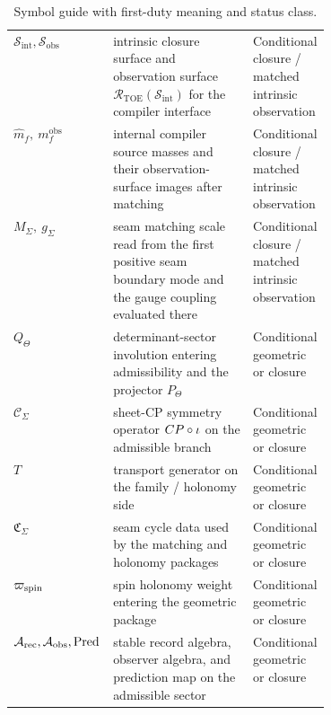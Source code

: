 \begin{table}[t]
\begin{tabularx}{\linewidth}{@{}>{\raggedright\arraybackslash}p{0.23\linewidth}Y>{\raggedright\arraybackslash}p{0.18\linewidth}@{}}
$\mathcal S_{\mathrm{int}},\mathcal S_{\mathrm{obs}}$ & intrinsic closure surface and observation surface $\mathcal R_{\mathrm{TOE}}(\mathcal S_{\mathrm{int}})$ for the compiler interface & Conditional closure / matched intrinsic observation \\
$\hat m_f,\ m_f^{\mathrm{obs}}$ & internal compiler source masses and their observation-surface images after matching & Conditional closure / matched intrinsic observation \\
$M_\Sigma,\ g_\Sigma$ & seam matching scale read from the first positive seam boundary mode and the gauge coupling evaluated there & Conditional closure / matched intrinsic observation \\
$Q_\Theta$ & determinant-sector involution entering admissibility and the projector $P_\Theta$ & Conditional geometric or closure \\
$\mathcal C_\Sigma$ & sheet-CP symmetry operator $CP\circ\iota$ on the admissible branch & Conditional geometric or closure \\
$T$ & transport generator on the family / holonomy side & Conditional geometric or closure \\
$\mathfrak C_\Sigma$ & seam cycle data used by the matching and holonomy packages & Conditional geometric or closure \\
$\varpi_{\mathrm{spin}}$ & spin holonomy weight entering the geometric package & Conditional geometric or closure \\
$\mathcal A_{\mathrm{rec}},\mathcal A_{\mathrm{obs}},\operatorname{Pred}$ & stable record algebra, observer algebra, and prediction map on the admissible sector & Conditional geometric or closure \\
\bottomrule
\end{tabularx}
\caption{Symbol guide with first-duty meaning and status class.}
\label{tab:symbol-guide}
\end{table}

